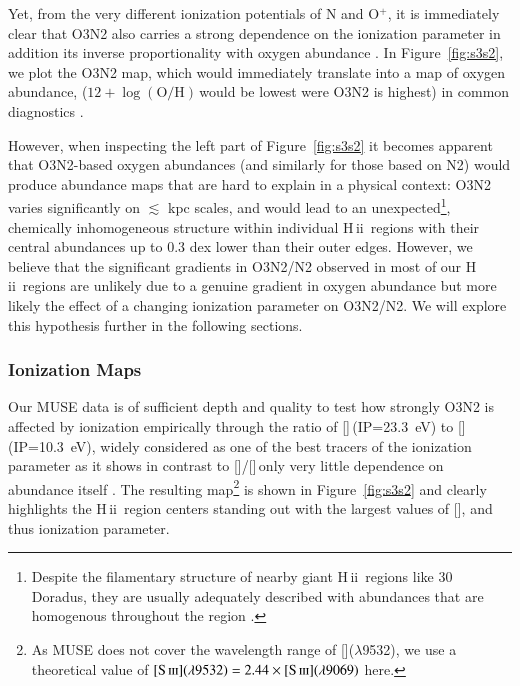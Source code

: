 \documentclass[traditabstract]{aa}
\newcommand{\hii}{\mbox{H\,{\sc ii}}}
\newcommand{\oh}{$12+\log(\mathrm{O/H})$}
\newcommand{\sii}{[\ion{S}{ii}]}
\newcommand{\siii}{[\ion{S}{iii}]}
\newcommand{\oii}{[\ion{O}{ii}]}
\newcommand{\oiii}{[\ion{O}{iii}]}
\begin{document}
Yet, from the very different ionization potentials of N and O$^{+}$, it is immediately clear that O3N2 also carries a strong dependence on the ionization parameter in addition its inverse proportionality with oxygen abundance \citep[e.g.][]{1979A&A....78..200A, 2015MNRAS.448.2030H}. In Figure~\ref{fig:s3s2}, we plot the O3N2 map, which would immediately translate into a map of oxygen abundance, (\oh\,would be lowest were O3N2 is highest) in common diagnostics \citep{2004MNRAS.348L..59P}.

However, when inspecting the left part of Figure~\ref{fig:s3s2} it becomes apparent that O3N2-based oxygen abundances  (and similarly for those based on N2) would produce abundance maps that are hard to explain in a physical context: O3N2 varies significantly on $\lesssim$ kpc scales, and would lead to an unexpected\footnote{Despite the filamentary structure of nearby giant \hii~regions like 30 Doradus, they are usually adequately described with abundances that are homogenous throughout the region \citep[e.g.][and references therein]{2011ApJ...738...34P}.}, chemically inhomogeneous structure within individual \hii~regions with their central abundances up to 0.3 dex lower than their outer edges. However, we believe that the significant gradients in O3N2/N2 observed in most of our \hii~regions are unlikely due to a genuine gradient in oxygen abundance but more likely the effect of a changing ionization parameter on O3N2/N2. We will explore this hypothesis further in the following sections.

\subsubsection{Ionization Maps}

Our MUSE data is of sufficient depth and quality to test how strongly O3N2 is affected by ionization empirically through the ratio of \siii\,(IP=23.3~eV) to \sii\,(IP=10.3~eV), widely considered as one of the best tracers of the ionization parameter \citep{1991MNRAS.253..245D} as it shows in contrast to \oiii/\oii\,only very little dependence on abundance itself \citep{2002ApJS..142...35K, 2011MNRAS.415.3616D}. The resulting map\footnote{As MUSE does not cover the wavelength range of \siii($\lambda$9532), we use a theoretical value of $\siii(\lambda9532)=2.44\times\siii(\lambda9069)$ \citep{1982MNRAS.199.1025M} here.} is shown in Figure~\ref{fig:s3s2} and clearly highlights the \hii~region centers standing out with the largest values of \siii, and thus ionization parameter. %
\end{document}
